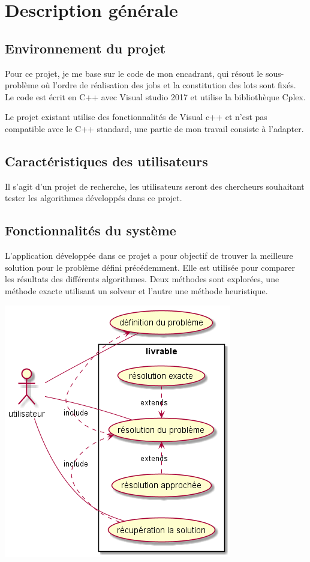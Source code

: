 \chapter{Description générale}

\section{Environnement du projet}
Pour ce projet, je me base sur le code de mon encadrant, qui résout le sous-problème où l'ordre de réalisation des jobs et la constitution des lots sont fixés.
Le code est écrit en C++ avec Visual studio 2017 et utilise la bibliothèque Cplex.

Le projet existant utilise des fonctionnalités de Visual c++ et n'est pas compatible avec le C++ standard,
 une partie de mon travail consiste à l'adapter.
\section{Caractéristiques des utilisateurs}
Il s'agit d'un projet de recherche, les utilisateurs seront des chercheurs souhaitant tester les algorithmes développés dans ce projet.
 
\section{Fonctionnalités du système}
L'application développée dans ce projet a pour objectif de trouver la meilleure solution pour le problème défini précédemment.
Elle est utilisée pour comparer les résultats des différents algorithmes.
Deux méthodes sont explorées, une méthode exacte utilisant un solveur et l'autre une méthode heuristique.

\includegraphics[width=\textwidth]{parts/description_generale/use_cases}

